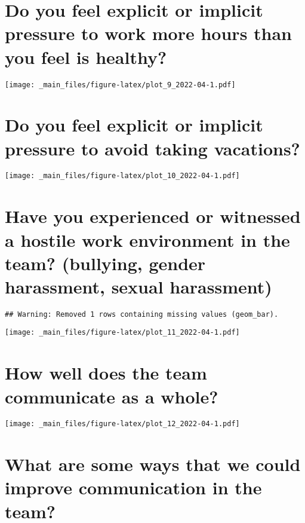 \documentclass[
]{book}
\begin{document}
\hypertarget{do-you-feel-explicit-or-implicit-pressure-to-work-more-hours-than-you-feel-is-healthy}{%
\section{Do you feel explicit or implicit pressure to work more hours than you feel is healthy?}\label{do-you-feel-explicit-or-implicit-pressure-to-work-more-hours-than-you-feel-is-healthy}}

\texttt{[image: \_main\_files/figure-latex/plot\_9\_2022-04-1.pdf]}

\hypertarget{do-you-feel-explicit-or-implicit-pressure-to-avoid-taking-vacations}{%
\section{Do you feel explicit or implicit pressure to avoid taking vacations?}\label{do-you-feel-explicit-or-implicit-pressure-to-avoid-taking-vacations}}

\texttt{[image: \_main\_files/figure-latex/plot\_10\_2022-04-1.pdf]}

\hypertarget{have-you-experienced-or-witnessed-a-hostile-work-environment-in-the-team-bullying-gender-harassment-sexual-harassment}{%
\section{Have you experienced or witnessed a hostile work environment in the team? (bullying, gender harassment, sexual harassment)}\label{have-you-experienced-or-witnessed-a-hostile-work-environment-in-the-team-bullying-gender-harassment-sexual-harassment}}

\begin{verbatim}
## Warning: Removed 1 rows containing missing values (geom_bar).
\end{verbatim}

\texttt{[image: \_main\_files/figure-latex/plot\_11\_2022-04-1.pdf]}

\hypertarget{how-well-does-the-team-communicate-as-a-whole}{%
\section{How well does the team communicate as a whole?}\label{how-well-does-the-team-communicate-as-a-whole}}

\texttt{[image: \_main\_files/figure-latex/plot\_12\_2022-04-1.pdf]}

\hypertarget{what-are-some-ways-that-we-could-improve-communication-in-the-team}{%
\section{What are some ways that we could improve communication in the team?}\label{what-are-some-ways-that-we-could-improve-communication-in-the-team}}
\end{document}
